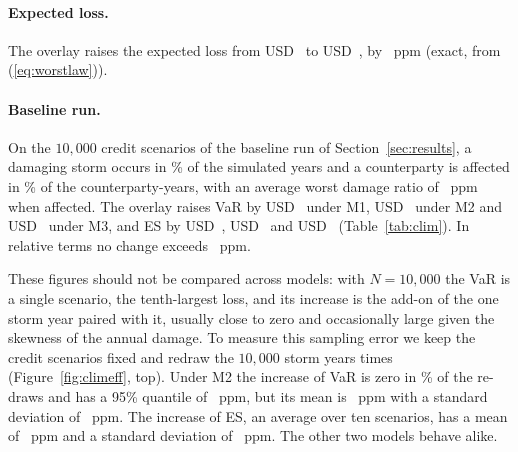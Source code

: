 \begin{table}[tb]
\caption{$99.9\%$ VaR and ES without the storm overlay (USD) and their increase with the overlay, in USD and in parts per million ($\phi_k=0.5$).}
\label{tab:clim}
\centering
{}
\end{table}

\paragraph{Expected loss.}
The overlay raises the expected loss from USD~ to USD~, by ~ppm (exact, from (\ref{eq:worstlaw})).

\paragraph{Baseline run.}
On the $10{,}000$ credit scenarios of the baseline run of Section~\ref{sec:results}, a damaging storm occurs in \% of the simulated years and a counterparty is affected in \% of the counterparty-years, with an average worst damage ratio of ~ppm when affected. The overlay raises VaR by USD~ under M1, USD~ under M2 and USD~ under M3, and ES by USD~, USD~ and USD~ (Table~\ref{tab:clim}). In relative terms no change exceeds ~ppm.

These figures should not be compared across models: with $N=10{,}000$ the VaR is a single scenario, the tenth-largest loss, and its increase is the add-on of the one storm year paired with it, usually close to zero and occasionally large given the skewness of the annual damage. To measure this sampling error we keep the credit scenarios fixed and redraw the $10{,}000$ storm years  times (Figure~\ref{fig:climeff}, top). Under M2 the increase of VaR is zero in \% of the re-draws and has a 95\% quantile of ~ppm, but its mean is ~ppm with a standard deviation of ~ppm. The increase of ES, an average over ten scenarios, has a mean of ~ppm and a standard deviation of ~ppm. The other two models behave alike.

